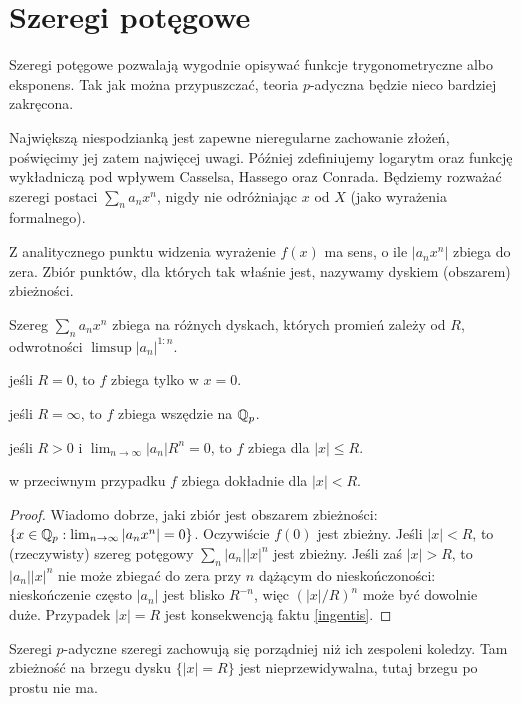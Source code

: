 \section{Szeregi potęgowe}
Szeregi  potęgowe pozwalają wygodnie opisywać funkcje trygonometryczne albo eksponens.
Tak jak można przypuszczać, teoria $p$-adyczna będzie nieco bardziej zakręcona.

Największą niespodzianką jest zapewne nieregularne zachowanie złożeń, poświęcimy jej zatem najwięcej uwagi.
Później zdefiniujemy logarytm oraz funkcję wykładniczą pod wpływem Casselsa, Hassego oraz Conrada.
Będziemy rozważać szeregi postaci $\sum_n a_n x^n$, nigdy nie odróżniając $x$ od $X$ (jako wyrażenia formalnego).

Z analitycznego punktu widzenia wyrażenie $f(x)$ ma sens, o ile $|a_n x^n|$ zbiega do zera.
Zbiór punktów, dla których tak właśnie jest, nazywamy dyskiem (obszarem) zbieżności.

\begin{fakt}
	Szereg $\sum_n a_n x^n$ zbiega na różnych dyskach, których promień zależy od $R$, odwrotności $\limsup |a_n|^{1:n}$.
	\begin{enumx}
	\item jeśli $R = 0$, to $f$ zbiega tylko w $x = 0$.
	\item jeśli $R = \infty$, to $f$ zbiega wszędzie na $\mathbb Q_p$.
	\item jeśli $R > 0$ i $\lim_{n \to \infty} |a_n| R^n = 0$, to $f$ zbiega dla $|x| \le R$.
	\item w przeciwnym przypadku $f$ zbiega dokładnie dla $|x| < R$.
	\end{enumx}
\end{fakt}

\begin{proof}
	Wiadomo dobrze, jaki zbiór jest obszarem zbieżności: $\{x \in \mathbb Q_p : \lim_{n \to \infty} |a_n x^n| = 0\}$.
	Oczywiście $f(0)$ jest zbieżny.
	Jeśli $|x| < R $, to (rzeczywisty) szereg potęgowy $\sum_n |a_n| |x|^n$ jest zbieżny.
	Jeśli zaś $|x| > R $, to $|a_n| |x|^n$ nie może zbiegać do zera przy $n$ dążącym do nieskończoności: nieskończenie często $|a_n|$ jest blisko $R ^{-n}$, więc $(|x|/R )^n$ może być dowolnie duże.
	Przypadek $|x| = R $ jest konsekwencją faktu \ref{ingentis}.
\end{proof}

Szeregi $p$-adyczne szeregi zachowują się porządniej niż ich zespoleni koledzy.
Tam zbieżność na brzegu dysku $\{|x| = R \}$ jest nieprzewidywalna, tutaj brzegu po prostu nie ma.

